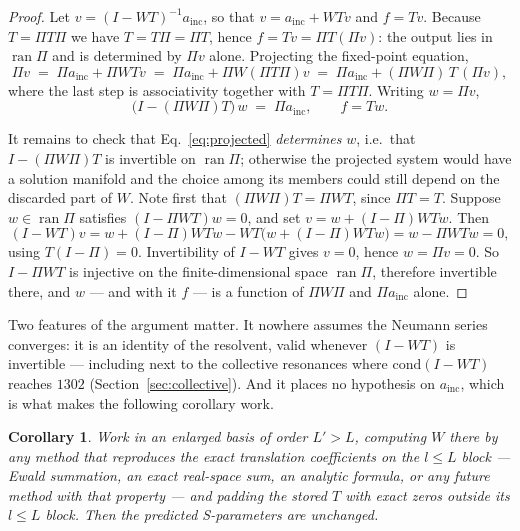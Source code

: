 \documentclass[11pt,a4paper]{article}
\theoremstyle{plain}
\newtheorem{corollary}[proposition]{Corollary}
\theoremstyle{definition}
\begin{document}
\begin{proof}
Let $v = (I - WT)^{-1}a_{\text{inc}}$, so that
$v = a_{\text{inc}} + W T v$ and $f = Tv$. Because $T = \Pi T \Pi$ we have $T = T\Pi =
\Pi T$, hence $f = Tv = \Pi T(\Pi v)$: the output lies in $\operatorname{ran}\Pi$ and is
determined by $\Pi v$ alone. Projecting the fixed-point equation,
\begin{equation*}
  \Pi v \;=\; \Pi a_{\text{inc}} + \Pi W T v
      \;=\; \Pi a_{\text{inc}} + \Pi W (\Pi T \Pi) v
      \;=\; \Pi a_{\text{inc}} + (\Pi W \Pi)\,T\,(\Pi v),
\end{equation*}
where the last step is associativity together with $T = \Pi T \Pi$. Writing $w = \Pi v$,
\begin{equation}
  \bigl(I - (\Pi W \Pi)T\bigr)\,w \;=\; \Pi a_{\text{inc}},
  \qquad
  f = T w .
  \label{eq:projected}
\end{equation}

It remains to check that Eq.~\eqref{eq:projected} \emph{determines} $w$, i.e.\
that $I - (\Pi W \Pi)T$ is invertible on $\operatorname{ran}\Pi$; otherwise the projected
system would have a solution manifold and the choice among its members could
still depend on the discarded part of $W$. Note first that $(\Pi W \Pi)T = \Pi W T$, since
$\Pi T = T$. Suppose $w \in \operatorname{ran}\Pi$ satisfies $(I - \Pi W T)w = 0$, and set
$v = w + (I - \Pi)WTw$. Then
\begin{equation*}
  (I - WT)v = w + (I-\Pi)WTw - WT\bigl(w + (I-\Pi)WTw\bigr) = w - \Pi W Tw = 0,
\end{equation*}
using $T(I-\Pi) = 0$. Invertibility of $I - WT$ gives $v = 0$, hence $w = \Pi v = 0$.
So $I - \Pi W T$ is injective on the finite-dimensional space
$\operatorname{ran}\Pi$, therefore invertible there, and $w$ --- and with it $f$ ---
is a function of $\Pi W \Pi$ and $\Pi a_{\text{inc}}$ alone.
\end{proof}

\noindent
Two features of the argument matter. It nowhere assumes the Neumann series
converges: it is an identity of the resolvent, valid whenever $(I - WT)$ is
invertible --- including next to the collective resonances where
$\mathrm{cond}(I - WT)$ reaches $1302$ (Section~\ref{sec:collective}). And it
places no hypothesis on $a_{\text{inc}}$, which is what makes the following
corollary work.

\begin{corollary}
\label{cor:padding}
Work in an enlarged basis of order $L' > L$, computing $W$ there by any method
that reproduces the exact translation coefficients on the $l \le L$ block ---
Ewald summation, an exact real-space sum, an analytic formula, or any future
method with that property --- and padding the stored $T$ with exact zeros outside
its $l \le L$ block. Then the predicted S-parameters are unchanged.
\end{corollary}
\end{document}
